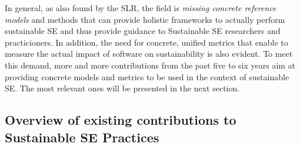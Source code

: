 \documentclass[oribibl]{llncs}
\begin{document}
In general, as also found by the SLR, the field is \textit{missing concrete reference models} and methods that can provide holistic frameworks to actually perform sustainable SE \cite{penzenstadler_sustainability_2012} and thus provide guidance to Sustainable SE researchers and practicioners. %
In addition, the need for concrete, unified metrics that enable to measure the actual impact of software on sustainability is also evident. %
To meet this demand, more and more contributions from the past five to six years aim at providing concrete models and metrics to be used in the context of sustainable SE. The most relevant ones will be presented in the next section.

\subsection{Overview of existing contributions to Sustainable SE Practices\label{overviewContributions}}%
\end{document}
